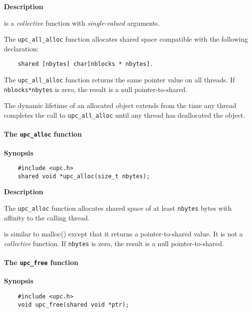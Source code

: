 {\bf Description}

 is a {\em collective} function with
    {\em single-valued} arguments.

\np The {\tt upc\_all\_alloc} function allocates  shared 
      space compatible with the following declaration:

\begin{verbatim}
    shared [nbytes] char[nblocks * nbytes].  
\end{verbatim}

\np The {\tt upc\_all\_alloc} function returns the same pointer
   value on all threads. 
   If {\tt nblocks*nbytes} is zero, the result is a null pointer-to-shared.
   
\np The dynamic lifetime of an allocated object extends from
   the time any thread completes the call to {\tt upc\_all\_alloc}
   until any thread has deallocated the object.

\paragraph{The {\tt upc\_alloc} function}

{\bf Synopsis} 

\npf\vspace{-2.5em}
\begin{verbatim}
    #include <upc.h> 
    shared void *upc_alloc(size_t nbytes); 
\end{verbatim}

{\bf Description}

\np The {\tt upc\_alloc} function allocates shared space of at
    least {\tt nbytes} bytes with affinity to the calling thread. 

 is similar to malloc() except that it
    returns a pointer-to-shared value. It is not a {\em collective} function.
    If {\tt nbytes} is zero, the result is a null pointer-to-shared.

\cbstart
{}
\cbend

\paragraph{The {\tt upc\_free} function}

{\bf Synopsis} 

\npf\vspace{-2.5em}
\begin{verbatim}
    #include <upc.h> 
    void upc_free(shared void *ptr); 
\end{verbatim}

